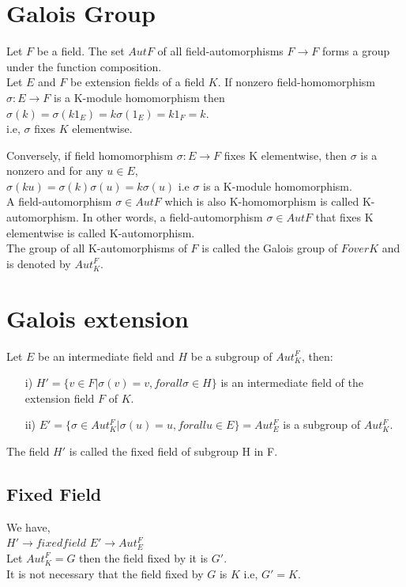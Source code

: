 \section{Galois Group}
Let \(F\) be a field. The set \(Aut F\) of all field-automorphisms \(F \rightarrow F \) forms a group under the function composition.\\

Let \(E\) and \(F\) be extension fields of a field \(K\). If nonzero field-homomorphism \(\sigma : E \rightarrow F\) is a K-module homomorphism then\\
\(\sigma(k)=\sigma(k1_E)=k\sigma(1_E)=k1_F=k\).\\
i.e, \(\sigma\) fixes \(K\) elementwise.

Conversely, if field homomorphism \(\sigma : E \rightarrow F\) fixes K elementwise, then \(\sigma\) is a nonzero and for any \(u \in E\),\\
\(\sigma(ku)=\sigma(k)\sigma(u)=k\sigma(u)\)
i.e \(\sigma\) is a K-module homomorphism.\\

A field-automorphism \(\sigma \in Aut F\) which is also K-homomorphism is called K-automorphism. In other words, a field-automorphism \(\sigma \in Aut F\) that fixes K elementwise is called K-automorphism.\\

The group of all K-automorphisms of \(F\) is called the Galois group of \(F over K\) and is denoted by \(Aut_K^F\).

\section{Galois extension}
Let \(E\) be an intermediate field and \(H\) be a subgroup of \(Aut_K^F\), then:
\begin{enumerate}
\item[i)] \(H' = \{v \in F | \sigma(v)=v, for all \sigma \in H \}\) is an intermediate field of the extension field \(F\) of \(K\).
\item[ii)] \(E' = \{\sigma \in Aut_K^F | \sigma(u)=u, for all u \in E\}=Aut_E^F\) is a subgroup of \(Aut_K^F\).
\end{enumerate}

The field \(H'\) is called the fixed field of subgroup H in F.

\subsection{Fixed Field}
We have,\\
\(H' \rightarrow fixed field \) \hspace{5mm} \(E' \rightarrow Aut_E^F\)\\
Let \(Aut_K^F = G\) then the field fixed by it is \(G'\).\\
It is not necessary that the field fixed by \(G\) is \(K\) i.e, \(G'=K\).\\

